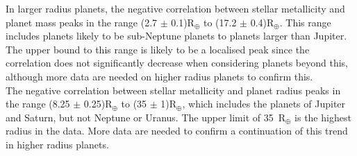 \documentclass[a4paper,twocolumn,12pt]{article}
\begin{document}
In larger radius planets, the negative correlation between stellar metallicity and planet mass peaks in the range (2.7 $\pm$ 0.1)R$_\oplus$ to (17.2 $\pm$ 0.4)R$_\oplus$. This range includes planets likely to be sub-Neptune planets to planets larger than Jupiter. The upper bound to this range is likely to be a localised peak since the correlation does not significantly decrease when considering planets beyond this, although more data are needed on higher radius planets to confirm this.\\
The negative correlation between stellar metallicity and planet radius peaks in the range (8.25 $\pm$ 0.25)R$_\oplus$ to (35 $\pm$ 1)R$_\oplus$, which includes the planets of Jupiter and Saturn, but not Neptune or Uranus. The upper limit of 35~R$_\oplus$ is the highest radius in the data. More data are needed to confirm a continuation of this trend in higher radius planets.


\end{document}
